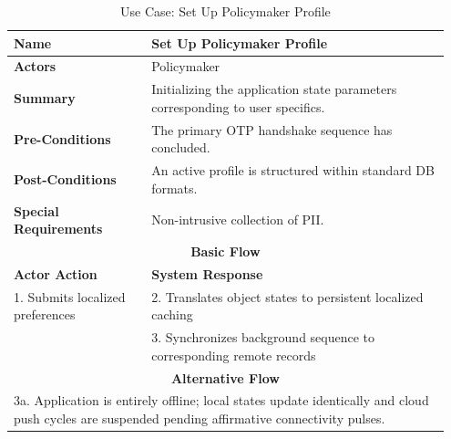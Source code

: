 \begin{table}[htbp]
  \centering
  \caption{Use Case: Set Up Policymaker Profile}
  \label{uc:setup_profile}
  \begin{tabular}{|p{0.3\linewidth}|p{0.65\linewidth}|}
    \hline
    \textbf{Name} & Set Up Policymaker Profile \\
    \hline
    \textbf{Actors} & Policymaker \\
    \hline
    \textbf{Summary} & Initializing the application state parameters corresponding to user specifics. \\
    \hline
    \textbf{Pre-Conditions} & The primary OTP handshake sequence has concluded. \\
    \hline
    \textbf{Post-Conditions} & An active profile is structured within standard DB formats. \\
    \hline
    \textbf{Special Requirements} & Non-intrusive collection of PII. \\
    \hline
    \multicolumn{2}{|c|}{\textbf{Basic Flow}} \\
    \hline
    \textbf{Actor Action} & \textbf{System Response} \\
    \hline
    1. Submits localized preferences & 2. Translates object states to persistent localized caching \\
    & 3. Synchronizes background sequence to corresponding remote records \\
    \hline
    \multicolumn{2}{|c|}{\textbf{Alternative Flow}} \\
    \hline
    \multicolumn{2}{|p{0.95\linewidth}|}{3a. Application is entirely offline; local states update identically and cloud push cycles are suspended pending affirmative connectivity pulses.} \\
    \hline
  \end{tabular}
\end{table}

